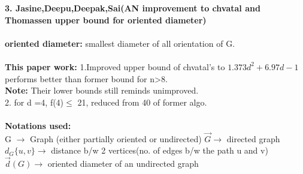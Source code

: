 \documentclass{article}
\begin{document}
{\newpage
\textbf{3. Jasine,Deepu,Deepak,Sai(AN improvement to chvatal and Thomassen upper bound for oriented diameter)} \\
\vspace{2cm} \\
\textbf{oriented diameter:} smallest diameter of all orientation of G. \\
\vspace{1 cm} \\
\textbf{This paper work:}
1.Improved upper bound of chvatal's to $1.373d^{2}+6.97d -1$ performs better than former bound for n>8.  \\
\textbf{Note:} Their lower bounds still reminds unimproved.\\
2. for d =4, f(4)$\leq$ 21, reduced from 40 of former algo.\\
\vspace{1cm }\\
\textbf{Notations used:}\\
G $\rightarrow$ Graph (either partially oriented or undirected)
$\overrightarrow{G}  \rightarrow$  directed graph \\
$d_{G}\lbrace u,v \rbrace \rightarrow$ distance b/w 2 vertices(no. of edges b/w the path u and v) \\
$\overrightarrow{d}(G) \rightarrow $ oriented diameter of an undirected graph \\






























}
\end{document}
